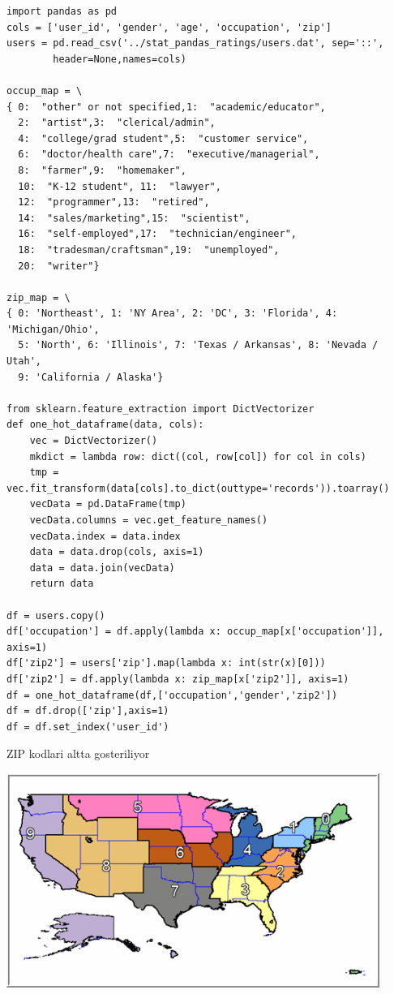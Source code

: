 \documentclass[12pt,fleqn]{article}\usepackage{../common}
\begin{document}
\begin{verbatim}
import pandas as pd
cols = ['user_id', 'gender', 'age', 'occupation', 'zip']
users = pd.read_csv('../stat_pandas_ratings/users.dat', sep='::', 
        header=None,names=cols)

occup_map = \
{ 0:  "other" or not specified,1:  "academic/educator",
  2:  "artist",3:  "clerical/admin",
  4:  "college/grad student",5:  "customer service",
  6:  "doctor/health care",7:  "executive/managerial",
  8:  "farmer",9:  "homemaker",
  10:  "K-12 student", 11:  "lawyer",
  12:  "programmer",13:  "retired",
  14:  "sales/marketing",15:  "scientist",
  16:  "self-employed",17:  "technician/engineer",
  18:  "tradesman/craftsman",19:  "unemployed",
  20:  "writer"}

zip_map = \
{ 0: 'Northeast', 1: 'NY Area', 2: 'DC', 3: 'Florida', 4: 'Michigan/Ohio', 
  5: 'North', 6: 'Illinois', 7: 'Texas / Arkansas', 8: 'Nevada / Utah', 
  9: 'California / Alaska'}

from sklearn.feature_extraction import DictVectorizer
def one_hot_dataframe(data, cols):
    vec = DictVectorizer()
    mkdict = lambda row: dict((col, row[col]) for col in cols)
    tmp = vec.fit_transform(data[cols].to_dict(outtype='records')).toarray()
    vecData = pd.DataFrame(tmp)
    vecData.columns = vec.get_feature_names()
    vecData.index = data.index
    data = data.drop(cols, axis=1)
    data = data.join(vecData)
    return data

df = users.copy()
df['occupation'] = df.apply(lambda x: occup_map[x['occupation']], axis=1)
df['zip2'] = users['zip'].map(lambda x: int(str(x)[0]))
df['zip2'] = df.apply(lambda x: zip_map[x['zip2']], axis=1)
df = one_hot_dataframe(df,['occupation','gender','zip2'])
df = df.drop(['zip'],axis=1)
df = df.set_index('user_id')
\end{verbatim}

ZIP kodlari altta gosteriliyor

\includegraphics[height=7cm]{zip_code_zones.png}
\end{document}
